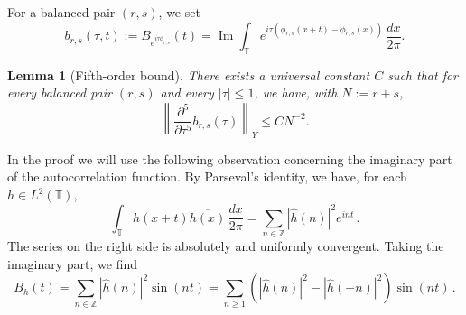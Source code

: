 \documentclass[10pt,a4paper]{amsart}
\newtheorem{lemma}[theorem]{Lemma}
\newcommand{\T}{\mathbb T}
\newcommand{\Z}{\mathbb Z}
\newcommand{\wh}{\widehat}
\begin{document}
For a balanced pair $(r,s)$, we set
$$
b_{r,s}(\tau,t) := B_{e^{i\tau\phi_{r,s}}}(t) = \operatorname{Im}\int_\T
 e^{i\tau(\phi_{r,s}(x+t)-\phi_{r,s}(x))}\,\frac{dx}{2\pi}.
$$

\begin{lemma}[Fifth-order bound]\label{lem:fifth-order}
There exists a universal constant $C$ such that for every balanced pair $(r,s)$ and every $|\tau|\leq1$, we have, with $N:=r+s$,
\begin{equation}\label{eq:fifth-order-bound}
 \left\|\frac{\partial^5}{\partial\tau^5}
 b_{r,s}(\tau)\right\|_Y
 \leq C N^{-2}.
\end{equation}
\end{lemma}

In the proof we will use the following observation concerning the imaginary part of the autocorrelation function. By Parseval's identity, we have, for each $h\in L^2(\T)$,
    $$
    \int_\T h(x+t) \overline{h(x)}\,\frac{dx}{2\pi} = \sum_{n\in\Z} |\wh h(n)|^2 e^{int} \,.
    $$
    The series on the right side is absolutely and uniformly convergent. Taking the imaginary part, we find
    \begin{equation}\label{eq:B-sine-series}
        B_h(t) = \sum_{n\in\Z} |\wh h(n)|^2 \sin(nt) = \sum_{n\geq 1} \left( |\wh h(n)|^2 - |\wh h(-n)|^2 \right) \sin(nt) \,.
    \end{equation}
\end{document}
